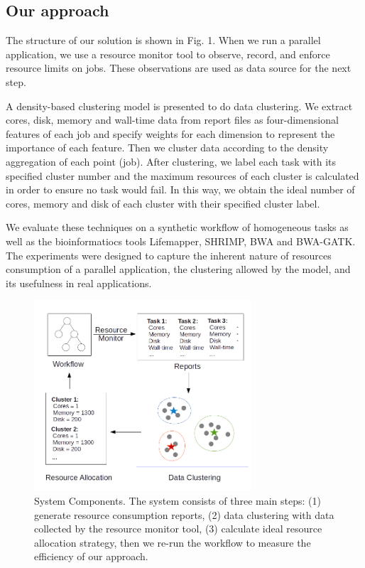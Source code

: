 \documentclass[conference]{IEEEtran}
\begin{document}
\subsection{Our approach}
The structure of our solution is shown in Fig. 1. When we run a parallel application, we use a resource monitor tool to observe, record, and enforce resource limits on jobs. These observations are used as data source for the next step.

A density-based clustering model is presented to do data clustering. We extract cores, disk, memory and wall-time data from report files as four-dimensional features of each job and specify weights for each dimension to represent the importance of each feature. Then we cluster data according to the density aggregation of each point (job). After clustering, we label each task with its specified cluster number and the maximum resources of each cluster is calculated in order to ensure no task would fail. In this way, we obtain the ideal number of cores, memory and disk of each cluster with their specified cluster label. 

We evaluate these techniques on a synthetic workflow of homogeneous tasks as well as the bioinformatiocs tools Lifemapper, SHRIMP, BWA and BWA-GATK. The experiments were designed to capture the inherent nature of resources consumption of a parallel application, the clustering allowed by the model, and its usefulness in real applications.

\begin{figure}[htbp]
\centering
\includegraphics[width=3.2in]{./flow.png} 
\caption{System Components. The system consists of three main steps: (1) generate resource consumption reports, (2) data clustering with data collected by the resource monitor tool, (3) calculate ideal resource allocation strategy, then we re-run the workflow to measure the efficiency of our approach.}
\end{figure}
\end{document}
